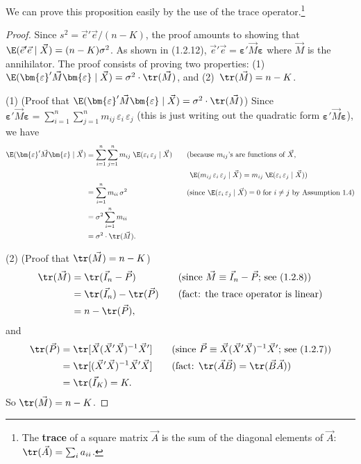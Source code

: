 We can prove this proposition easily by the use of the trace
operator.\footnote{The \textbf{trace} of a square matrix $\vec{A}$ is the sum of
the diagonal elements of $\vec{A}$:
$\tr(\vec{A}) = \sum_{i} a_{ii}$.}

\begin{proof}
Since $s^{2} = \vec{e}'\vec{e}/(n - K)$, the proof amounts to showing that
$\E(\vec{e}'\vec{e} \mid \vec{X}) = (n - K)\sigma^{2}$.  As shown in (1.2.12),
$\vec{e}'\vec{e} = \bm{\varepsilon}'\vec{M}\bm{\varepsilon}$ where $\vec{M}$ is the
annihilator.  The proof consists of proving two properties:
(1)~$\E(\bm{\varepsilon}'\vec{M}\bm{\varepsilon} \mid \vec{X})
  = \sigma^{2} \cdot \tr(\vec{M})$, and
(2)~$\tr(\vec{M}) = n - K$.

\medskip\noindent
(1) (Proof that
$\E(\bm{\varepsilon}'\vec{M}\bm{\varepsilon} \mid \vec{X})
  = \sigma^{2} \cdot \tr(\vec{M})$)\quad
Since $\bm{\varepsilon}'\vec{M}\bm{\varepsilon}
  = \sum_{i=1}^{n}\sum_{j=1}^{n} m_{ij}\,\varepsilon_{i}\,\varepsilon_{j}$
(this is just writing out the quadratic form $\bm{\varepsilon}'\vec{M}\bm{\varepsilon}$),
we have
%
\begin{align*}
  \E(\bm{\varepsilon}'\vec{M}\bm{\varepsilon} \mid \vec{X})
    &= \sum_{i=1}^{n}\sum_{j=1}^{n} m_{ij}\;\E(\varepsilon_{i}\,\varepsilon_{j}
       \mid \vec{X})
    &\quad&\text{(because $m_{ij}$'s are functions of $\vec{X}$,} \\
    & &&\phantom{\text{(}}\text{$\E(m_{ij}\,\varepsilon_{i}\,\varepsilon_{j} \mid \vec{X})
       = m_{ij}\;\E(\varepsilon_{i}\,\varepsilon_{j} \mid \vec{X})$)} \\
    &= \sum_{i=1}^{n} m_{ii}\,\sigma^{2}
    &&\text{(since $\E(\varepsilon_{i}\,\varepsilon_{j} \mid \vec{X}) = 0$
       for $i \neq j$ by Assumption 1.4)} \\
    &= \sigma^{2} \sum_{i=1}^{n} m_{ii} \\
    &= \sigma^{2} \cdot \tr(\vec{M}).
\end{align*}

\medskip\noindent
(2) (Proof that $\tr(\vec{M}) = n - K$)
%
\begin{align*}
  \tr(\vec{M})
    &= \tr(\vec{I}_{n} - \vec{P})
      &\quad&\text{(since $\vec{M} \equiv \vec{I}_{n} - \vec{P}$; see (1.2.8))} \\
    &= \tr(\vec{I}_{n}) - \tr(\vec{P})
      &&\text{(fact: the trace operator is linear)} \\
    &= n - \tr(\vec{P}),
\end{align*}
%
and
%
\begin{align*}
  \tr(\vec{P})
    &= \tr[\vec{X}(\vec{X}'\vec{X})^{-1}\vec{X}']
      &\quad&\text{(since $\vec{P} \equiv \vec{X}(\vec{X}'\vec{X})^{-1}\vec{X}'$;
      see (1.2.7))} \\
    &= \tr[(\vec{X}'\vec{X})^{-1}\vec{X}'\vec{X}]
      &&\text{(fact: $\tr(\vec{A}\vec{B}) = \tr(\vec{B}\vec{A})$)} \\
    &= \tr(\vec{I}_{K}) = K.
\end{align*}
%
So $\tr(\vec{M}) = n - K$.
\end{proof}

